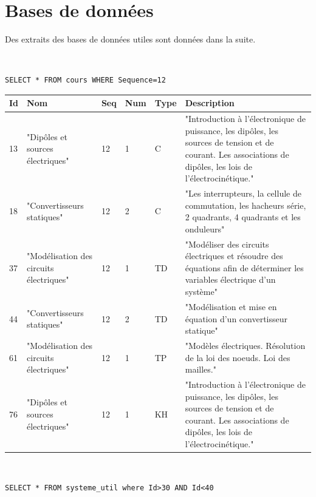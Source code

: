 \section{Bases de données}

Des extraits des bases de données utiles sont données dans la suite.

~\

\begin{GrayBox}[0.85\textwidth]
\begin{verbatim}SELECT * FROM cours WHERE Sequence=12
\end{verbatim}
\end{GrayBox}

\begin{center}
\begin{tabular}{|p{1cm}|p{3cm}|p{1cm}|p{1cm}|p{1cm}|p{6cm}|}
\hline
\textbf{Id} & Nom & Seq & Num & Type & Description \\ \hline
13 & "Dipôles et sources électriques" & 12 & 1 & C & "Introduction à l'électronique de puissance, les dipôles, les sources de tension et de courant. Les associations de dipôles, les lois de l'électrocinétique." \\ \hline
18 & "Convertisseurs statiques" & 12 & 2 & C & "Les interrupteurs, la cellule de commutation, les hacheurs série, 2 quadrants, 4 quadrants et les onduleurs" \\ \hline
37 & "Modélisation des circuits électriques" & 12 & 1 & TD & "Modéliser des circuits électriques et résoudre des équations afin de déterminer les variables électrique d'un système" \\ \hline
44 & "Convertisseurs statiques" & 12 & 2 & TD & "Modélisation et mise en équation d'un convertisseur statique" \\ \hline
61 & "Modélisation des circuits électriques" & 12 & 1 & TP & "Modèles électriques. Résolution de la loi des noeuds. Loi des mailles." \\ \hline
76 & "Dipôles et sources électriques" & 12 & 1 & KH & "Introduction à l'électronique de puissance, les dipôles, les sources de tension et de courant. Les associations de dipôles, les lois de l'électrocinétique." \\ \hline
\end{tabular}
\end{center}

~\

\begin{GrayBox}[0.85\textwidth]
\begin{verbatim}SELECT * FROM systeme_util where Id>30 AND Id<40
\end{verbatim}
\end{GrayBox}

